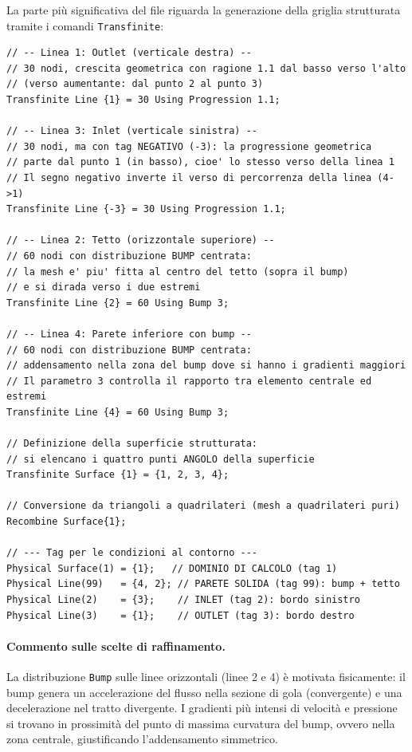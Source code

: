 La parte più significativa del file riguarda la generazione della griglia strutturata tramite
i comandi \texttt{Transfinite}:

\begin{lstlisting}[style=gmsh, caption={Comandi Transfinite per la mesh strutturata del bump.}, label={lst:bump_transfinite}]
// -- Linea 1: Outlet (verticale destra) --
// 30 nodi, crescita geometrica con ragione 1.1 dal basso verso l'alto
// (verso aumentante: dal punto 2 al punto 3)
Transfinite Line {1} = 30 Using Progression 1.1;

// -- Linea 3: Inlet (verticale sinistra) --
// 30 nodi, ma con tag NEGATIVO (-3): la progressione geometrica
// parte dal punto 1 (in basso), cioe' lo stesso verso della linea 1
// Il segno negativo inverte il verso di percorrenza della linea (4->1)
Transfinite Line {-3} = 30 Using Progression 1.1;

// -- Linea 2: Tetto (orizzontale superiore) --
// 60 nodi con distribuzione BUMP centrata:
// la mesh e' piu' fitta al centro del tetto (sopra il bump)
// e si dirada verso i due estremi
Transfinite Line {2} = 60 Using Bump 3;

// -- Linea 4: Parete inferiore con bump --
// 60 nodi con distribuzione BUMP centrata:
// addensamento nella zona del bump dove si hanno i gradienti maggiori
// Il parametro 3 controlla il rapporto tra elemento centrale ed estremi
Transfinite Line {4} = 60 Using Bump 3;

// Definizione della superficie strutturata:
// si elencano i quattro punti ANGOLO della superficie
Transfinite Surface {1} = {1, 2, 3, 4};

// Conversione da triangoli a quadrilateri (mesh a quadrilateri puri)
Recombine Surface{1};

// --- Tag per le condizioni al contorno ---
Physical Surface(1) = {1};   // DOMINIO DI CALCOLO (tag 1)
Physical Line(99)   = {4, 2}; // PARETE SOLIDA (tag 99): bump + tetto
Physical Line(2)    = {3};    // INLET (tag 2): bordo sinistro
Physical Line(3)    = {1};    // OUTLET (tag 3): bordo destro
\end{lstlisting}

\paragraph{Commento sulle scelte di raffinamento.}
La distribuzione \texttt{Bump} sulle linee orizzontali (linee 2 e 4) è motivata fisicamente:
il bump genera un accelerazione del flusso nella sezione di gola (convergente) e una
decelerazione nel tratto divergente. I gradienti più intensi di velocità e pressione si
trovano in prossimità del punto di massima curvatura del bump, ovvero nella zona centrale,
giustificando l'addensamento simmetrico.

